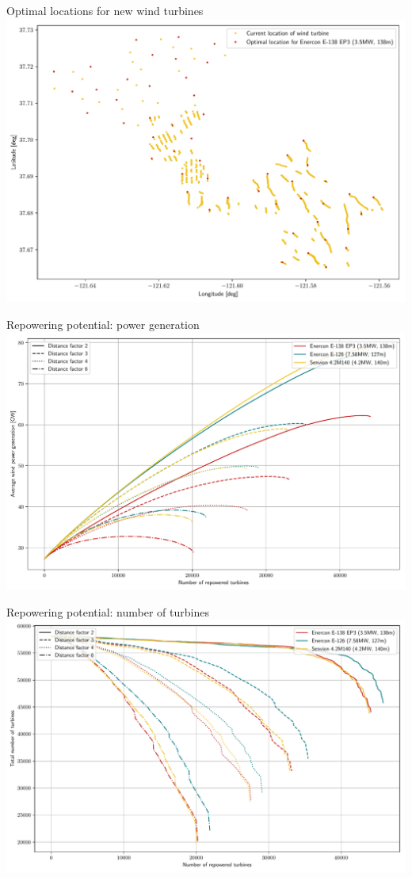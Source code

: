 \documentclass[color=usenames,dvipsnames]{beamer}
\begin{document}
    \begin{frame}{Optimal locations for new wind turbines}
        \includegraphics[width=\textwidth]{../../figures/optimized_cluster.pdf}
    \end{frame}

    \begin{frame}{Repowering potential: power generation}
        \includegraphics[width=\textwidth]{../../figures/repower_potential_power_generation.pdf}
    \end{frame}

    \begin{frame}{Repowering potential: number of turbines}
        \includegraphics[width=\textwidth]{../../figures/repower_potential_num_turbines.pdf}
    \end{frame}
\end{document}

